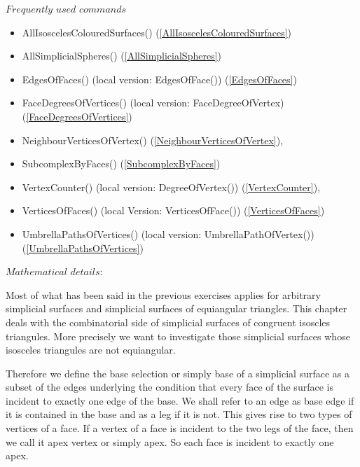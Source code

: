 \documentclass[a4paper,11pt]{report}
\begin{document}
{{ $Frequently$ $used$ $commands$ 
\begin{itemize}
\item  AllIsoscelesColouredSurfaces() (\ref{AllIsoscelesColouredSurfaces}) 
\item  AllSimplicialSpheres() (\ref{AllSimplicialSpheres}) 
\item  EdgesOfFaces() (local version: EdgesOfFace()) (\ref{EdgesOfFaces}) 
\item  FaceDegreesOfVertices() (local version: FaceDegreeOfVertex) (\ref{FaceDegreesOfVertices}) 
\item  NeighbourVerticesOfVertex() (\ref{NeighbourVerticesOfVertex}), 
\item  SubcomplexByFaces() (\ref{SubcomplexByFaces}) 
\item  VertexCounter() (local version: DegreeOfVertex()) (\ref{VertexCounter}), 
\item  VerticesOfFaces() (local Version: VerticesOfFace()) (\ref{VerticesOfFaces}) 
\item  UmbrellaPathsOfVertices() (local version: UmbrellaPathOfVertex()) (\ref{UmbrellaPathsOfVertices}) 
\end{itemize}
 $ Mathematical$ $details:$ 

 Most of what has been said in the previous exercises applies for arbitrary
simplicial surfaces and simplicial surfaces of equiangular triangles. This
chapter deals with the combinatorial side of simplicial surfaces of congruent
isoscles triangules. More precisely we want to investigate those simplicial
surfaces whose isosceles triangules are not equiangular. 

 
\begin{center}

\end{center}
 

 Therefore we define the base selection or simply base of a simplicial surface
as a subset of the edges underlying the condition that every face of the
surface is incident to exactly one edge of the base. We shall refer to an edge
as base edge if it is contained in the base and as a leg if it is not. This
gives rise to two types of vertices of a face. If a vertex of a face is
incident to the two legs of the face, then we call it apex vertex or simply
apex. So each face is incident to exactly one apex. 

 
\begin{center}

\end{center}
 

}}
\end{document}
